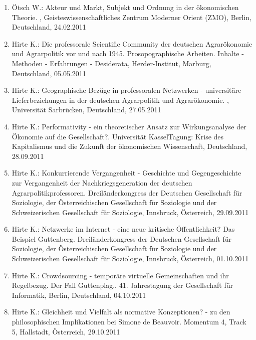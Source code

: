 \begin{enumerate}
	\item Ötsch W.: Akteur und Markt, Subjekt und Ordnung in der ökonomischen Theorie. , Geisteswissenschaftliches Zentrum Moderner Orient (ZMO), Berlin, Deutschland, 24.02.2011
	\item Hirte K.: Die professorale Scientific Community der deutschen Agrarökonomie und Agrarpolitik vor und nach 1945. Prosopographische Arbeiten. Inhalte - Methoden - Erfahrungen - Desiderata, Herder-Institut, Marburg, Deutschland, 05.05.2011
	\item Hirte K.: Geographische Bezüge in professoralen Netzwerken - universitäre Lieferbeziehungen in der deutschen Agrarpolitik und Agrarökonomie. , Universität Sarbrücken, Deutschland, 27.05.2011
	\item Hirte K.: Performativity - ein theoretischer Ansatz zur Wirkungsanalyse der Ökonomie auf die Gesellschaft?. Universität KasselTagung: Krise des Kapitalismus und die Zukunft der ökonomischen Wissenschaft, Deutschland, 28.09.2011
	\item Hirte K.: Konkurrierende Vergangenheit - Geschichte und Gegengeschichte zur Vergangenheit der Nachkriegsgeneration der deutschen Agrarpolitikprofessoren. Dreiländerkongress der Deutschen Gesellschaft für Soziologie, der Österreichischen Gesellschaft für Soziologie und der Schweizerischen Gesellschaft für Soziologie, Innsbruck, Österreich, 29.09.2011
	\item Hirte K.: Netzwerke im Internet - eine neue kritische Öffentlichkeit? Das Beispiel Guttenberg. Dreiländerkongress der Deutschen Gesellschaft für Soziologie, der Österreichischen Gesellschaft für Soziologie und der Schweizerischen Gesellschaft für Soziologie, Innsbruck, Österreich, 01.10.2011
	\item Hirte K.: Crowdsourcing - temporäre virtuelle Gemeinschaften und ihr Regelbezug. Der Fall Guttenplag.. 41. Jahrestagung der Gesellschaft für Informatik, Berlin, Deutschland, 04.10.2011
	\item Hirte K.: Gleichheit und Vielfalt als normative Konzeptionen? - zu den philosophischen Implikationen bei Simone de Beauvoir. Momentum 4, Track 5, Hallstadt, Österreich, 29.10.2011
\end{enumerate}

